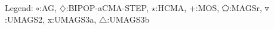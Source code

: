 Legend: {\color{CornflowerBlue}$\circ$}:AG, {\color{Orange}$\diamondsuit$}:BIPOP-aCMA-STEP, {\color{Green}$\star$}:HCMA, {\color{red}+}:MOS, {\color{magenta}$\pentagon$}:MAGSr, {\color{brown}$\triangledown$}:UMAGS2, {{}x}:UMAGS3a, {{}$\triangle$}:UMAGS3b